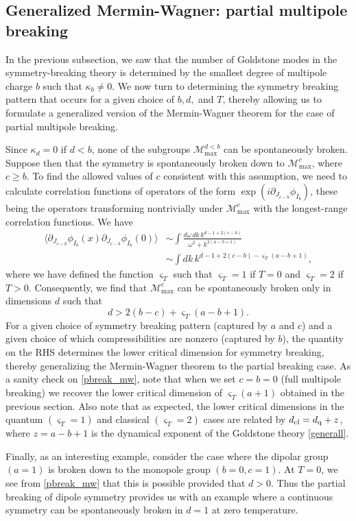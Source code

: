 \documentclass[pra,aps,twocolumn, amsfonts,amsmath,amssymb,nofootinbib,superscriptaddress]{revtex4-2}
\renewcommand{\max}{\text{max}}
\newcommand{\mmax}[1]{\mathcal{M}^{#1}_\max}
\newcommand\be            {\begin{equation}}
\newcommand\ee            {\end{equation}}
\newcommand\ba            {\begin{aligned}}
\newcommand\ea            {\end{aligned}}
\newcommand{\p}{\partial}
\begin{document}
	

\subsection{Generalized Mermin-Wagner: partial multipole breaking}

In the previous subsection, we saw that the number of Goldstone modes in the symmetry-breaking theory is determined by the smallest degree of multipole charge $b$ such that $\kappa_b\neq0$. We now turn to determining the symmetry breaking pattern that occurs for a given choice of $b,d,$ and $T$, thereby allowing us to formulate a generalized version of the Mermin-Wagner theorem for the case of partial multipole breaking. 

Since $\kappa_d=0$ if $d<b$, none of the subgroups $\mmax {d<b}$ can be spontaneously broken. Suppose then that the symmetry is spontaneously broken down to $\mmax {c}$, where $c\geq b$. To find the allowed values of $c$ consistent with this assumption, we need to calculate correlation functions of operators of the form $\exp(i\p_{J_{c-b}}\phi_{I_b})$, these being the operators transforming nontrivially under $\mmax c$ with the longest-range correlation functions. We have 
\be\ba \langle \p_{J_{c-b}}\phi_{I_b}(x) \p_{J_{c-b}}\phi_{I_b}(0)\rangle & \sim \int \frac{d\omega \, dk\, k^{d-1+2(c-b)}}{\omega^2 + k^{2(a-b+1)}} \\ 
& \sim \int dk\, k^{d-1+2(c-b) - \varsigma_T(a-b+1)}, \ea\ee 
where we have defined the function $\varsigma_T$ such that $\varsigma_T = 1$ if $T=0$ and $\varsigma_T = 2$ if $T>0$. Consequently, we find that $\mmax c$ can be spontaneously broken only in dimensions $d$ such that 
\be \label{pbreak_mw} d>2(b-c) + \varsigma_T(a-b+1).\ee 
For a given choice of symmetry breaking pattern (captured by $a$ and $c$) and a given choice of which compressibilities are nonzero (captured by $b$), the quantity on the RHS determines the lower critical dimension for symmetry breaking, thereby generalizing the Mermin-Wagner theorem to the partial breaking case. 
As a sanity check on \eqref{pbreak_mw}, note that when we set $c=b=0$ (full multipole breaking) we recover the lower critical dimension of $\varsigma_T(a+1)$ obtained in the previous section. Also note that as expected, the lower critical dimensions in the quantum $(\varsigma_T = 1)$ and classical $(\varsigma_T = 2)$ cases are related by $d_{\rm cl} = d_{\rm q} + z$, where $z=a-b+1$ is the dynamical exponent of the Goldstone theory \eqref{generall}. 

Finally, as an interesting example, consider the case where the dipolar group $(a=1)$ is broken down to the monopole group $(b=0,c=1)$. At $T=0$, we see from \eqref{pbreak_mw} that this is possible provided that $d>0$. Thus the partial breaking of dipole symmetry provides us with an example where a continuous symmetry can be spontaneously broken in $d=1$ at zero temperature. 
\end{document}
